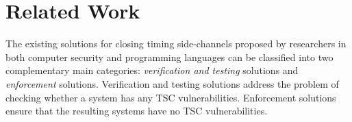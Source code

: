 \section{Related Work}
\label{sec:RelatedWork}

The existing solutions for closing timing side-channels proposed by researchers in both computer security and programming languages can be classified into two complementary main categories: \emph{verification and testing} solutions and \emph{enforcement} solutions. {Verification and testing} solutions address the problem of checking whether a system has any TSC vulnerabilities. {Enforcement} solutions ensure that the resulting systems have no TSC vulnerabilities. %

